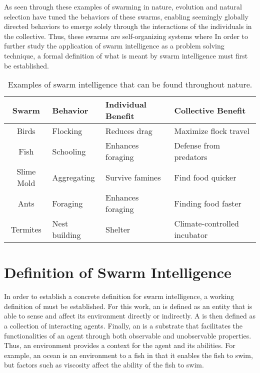As seen through these examples of swarming in nature, evolution and natural selection have tuned the behaviors of these swarms, enabling seemingly globally directed behaviors to emerge solely through the interactions of the individuals in the collective.  Thus, these swarms are self-organizing systems where   In order to further study the application of swarm intelligence as a problem solving technique, a formal definition of what is meant by swarm intelligence must first be established.

\begin{table}[ht]
  \centering
  \begin{tabular}{|c|l|l|l|}
    \hline
    Swarm & Behavior & Individual Benefit & Collective Benefit \\
    \hline
    Birds            & Flocking         & Reduces drag           & Maximize flock travel \\
    Fish              & Schooling      & Enhances foraging  & Defense from predators \\
    Slime Mold & Aggregating   & Survive famines       & Find food quicker \\
    Ants             & Foraging         & Enhances foraging  & Finding food faster \\
    Termites      & Nest building & Shelter                      & Climate-controlled incubator \\
    \hline
  \end{tabular}
  \caption{Examples of swarm intelligence that can be found throughout nature.}
  \label{tab:SwarmExamples}
\end{table}

\section{Definition of Swarm Intelligence}

In order to establish a concrete definition for swarm intelligence, a working definition of  must be established.  For this work, an  is defined as an entity that is able to sense and affect its environment directly or indirectly.  A  is then defined as a collection of interacting agents.  Finally, an  is a substrate that facilitates the functionalities of an agent through both observable and unobservable properties.  Thus, an environment provides a context for the agent and its abilities.  For example, an ocean is an environment to a fish in that it enables the fish to swim, but factors such as viscosity affect the ability of the fish to swim.

